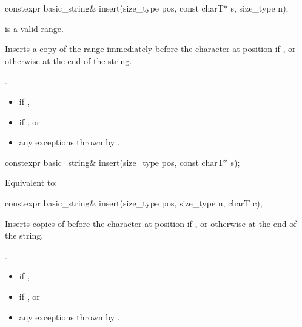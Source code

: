 %
\begin{itemdecl}
constexpr basic_string& insert(size_type pos, const charT* s, size_type n);
\end{itemdecl}

\begin{itemdescr}
\pnum
\expects
{} is a valid range.

\pnum
\effects
Inserts a copy of the range 
immediately before the character at position  if ,
or otherwise at the end of the string.

\pnum
\returns
{}.

\pnum
\throws
\begin{itemize}
\item {} if ,
\item {} if , or
\item any exceptions thrown by .
\end{itemize}
\end{itemdescr}

%
\begin{itemdecl}
constexpr basic_string& insert(size_type pos, const charT* s);
\end{itemdecl}

\begin{itemdescr}
\pnum
\effects
Equivalent to: 
\end{itemdescr}

%
\begin{itemdecl}
constexpr basic_string& insert(size_type pos, size_type n, charT c);
\end{itemdecl}

\begin{itemdescr}
\pnum
\effects
Inserts  copies of  before the character at position 
if ,
or otherwise at the end of the string.

\pnum
\returns
{}.

\pnum
\throws
\begin{itemize}
\item {} if ,
\item {} if , or
\item any exceptions thrown by .
\end{itemize}
\end{itemdescr}


